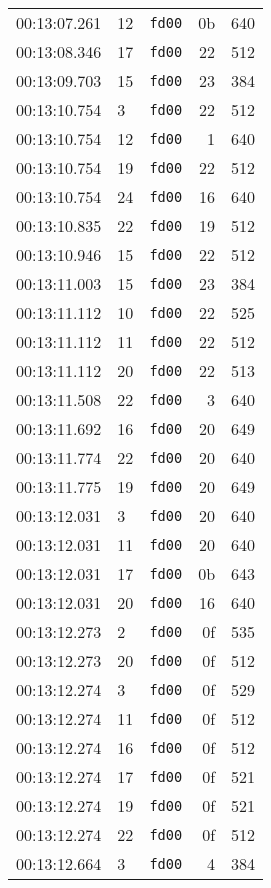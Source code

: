 \documentclass{article}
\begin{document}
\begin{longtable}{lllrr}
00:13:07.261 & 12 & \texttt{fd00} & 0b & 640 \\
00:13:08.346 & 17 & \texttt{fd00} & 22 & 512 \\
00:13:09.703 & 15 & \texttt{fd00} & 23 & 384 \\
00:13:10.754 & 3 & \texttt{fd00} & 22 & 512 \\
00:13:10.754 & 12 & \texttt{fd00} & 1 & 640 \\
00:13:10.754 & 19 & \texttt{fd00} & 22 & 512 \\
00:13:10.754 & 24 & \texttt{fd00} & 16 & 640 \\
00:13:10.835 & 22 & \texttt{fd00} & 19 & 512 \\
00:13:10.946 & 15 & \texttt{fd00} & 22 & 512 \\
00:13:11.003 & 15 & \texttt{fd00} & 23 & 384 \\
00:13:11.112 & 10 & \texttt{fd00} & 22 & 525 \\
00:13:11.112 & 11 & \texttt{fd00} & 22 & 512 \\
00:13:11.112 & 20 & \texttt{fd00} & 22 & 513 \\
00:13:11.508 & 22 & \texttt{fd00} & 3 & 640 \\
00:13:11.692 & 16 & \texttt{fd00} & 20 & 649 \\
00:13:11.774 & 22 & \texttt{fd00} & 20 & 640 \\
00:13:11.775 & 19 & \texttt{fd00} & 20 & 649 \\
00:13:12.031 & 3 & \texttt{fd00} & 20 & 640 \\
00:13:12.031 & 11 & \texttt{fd00} & 20 & 640 \\
00:13:12.031 & 17 & \texttt{fd00} & 0b & 643 \\
00:13:12.031 & 20 & \texttt{fd00} & 16 & 640 \\
00:13:12.273 & 2 & \texttt{fd00} & 0f & 535 \\
00:13:12.273 & 20 & \texttt{fd00} & 0f & 512 \\
00:13:12.274 & 3 & \texttt{fd00} & 0f & 529 \\
00:13:12.274 & 11 & \texttt{fd00} & 0f & 512 \\
00:13:12.274 & 16 & \texttt{fd00} & 0f & 512 \\
00:13:12.274 & 17 & \texttt{fd00} & 0f & 521 \\
00:13:12.274 & 19 & \texttt{fd00} & 0f & 521 \\
00:13:12.274 & 22 & \texttt{fd00} & 0f & 512 \\
00:13:12.664 & 3 & \texttt{fd00} & 4 & 384 \\

\end{longtable}
\end{document}
